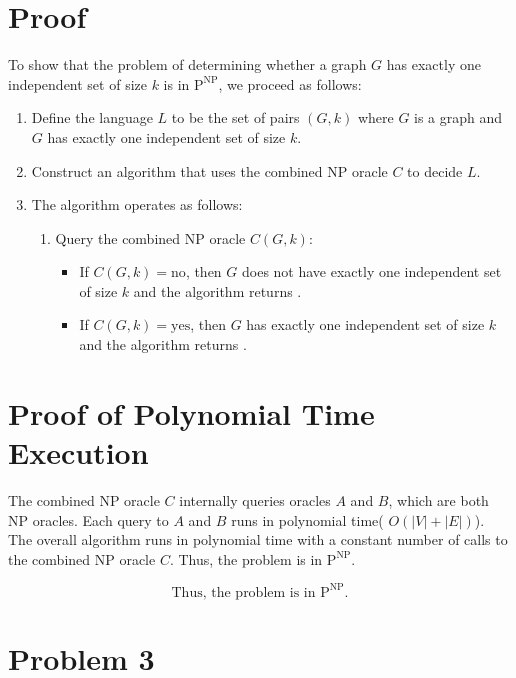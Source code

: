 \documentclass{article}
\begin{document}
\section*{Proof}

To show that the problem of determining whether a graph \( G \) has exactly one independent set of size \( k \) is in \( \text{P}^{\text{NP}} \), we proceed as follows:

\begin{enumerate}
    \item Define the language \( L \) to be the set of pairs \( (G, k) \) where \( G \) is a graph and \( G \) has exactly one independent set of size \( k \).
    \item Construct an algorithm that uses the combined NP oracle \( C \) to decide \( L \).
    \item The algorithm operates as follows:
    \begin{enumerate}
        \item Query the combined NP oracle \( C(G, k) \):
        \begin{itemize}
            \item If \( C(G, k) = \text{no} \), then \( G \) does not have exactly one independent set of size \( k \) and the algorithm returns .
            \item If \( C(G, k) = \text{yes} \), then \( G \) has exactly one independent set of size \( k \) and the algorithm returns .
        \end{itemize}
    \end{enumerate}
\end{enumerate}

\section*{Proof of Polynomial Time Execution}

The combined NP oracle \( C \) internally queries oracles \( A \) and \( B \), which are both NP oracles. Each query to \( A \) and \( B \) runs in polynomial time( \(O(|V| + |E|)\)). The overall algorithm runs in polynomial time with a constant number of calls to the combined NP oracle \( C \). Thus, the problem is in \( \text{P}^{\text{NP}} \).

\[
\boxed{\text{Thus, the problem is in } \text{P}^{\text{NP}}.}
\]


\pagebreak
\section{Problem 3}
\end{document}
